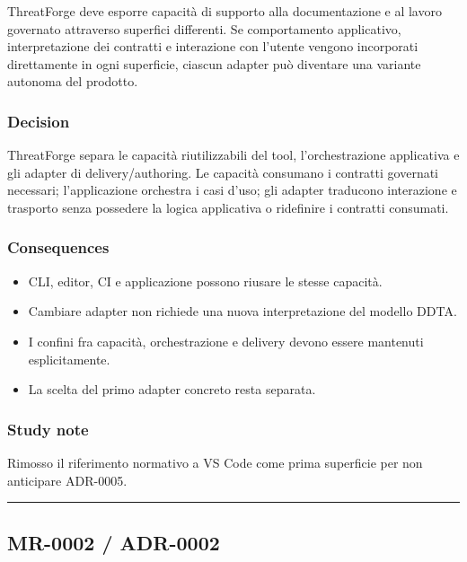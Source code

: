 \documentclass[
  10pt,
  a4paper,
]{article}
\providecommand{\tightlist}{%
  \setlength{\itemsep}{0pt}\setlength{\parskip}{0pt}}
\begin{document}
ThreatForge deve esporre capacità di supporto alla documentazione e al
lavoro governato attraverso superfici differenti. Se comportamento
applicativo, interpretazione dei contratti e interazione con l'utente
vengono incorporati direttamente in ogni superficie, ciascun adapter può
diventare una variante autonoma del prodotto.

\subsubsection{Decision}\label{decision-8}

ThreatForge separa le capacità riutilizzabili del tool, l'orchestrazione
applicativa e gli adapter di delivery/authoring. Le capacità consumano i
contratti governati necessari; l'applicazione orchestra i casi d'uso;
gli adapter traducono interazione e trasporto senza possedere la logica
applicativa o ridefinire i contratti consumati.

\subsubsection{Consequences}\label{consequences-8}

\begin{itemize}
\tightlist
\item
  CLI, editor, CI e applicazione possono riusare le stesse capacità.
\item
  Cambiare adapter non richiede una nuova interpretazione del modello
  DDTA.
\item
  I confini fra capacità, orchestrazione e delivery devono essere
  mantenuti esplicitamente.
\item
  La scelta del primo adapter concreto resta separata.
\end{itemize}

\subsubsection{Study note}\label{study-note-5}

Rimosso il riferimento normativo a VS Code come prima superficie per non
anticipare ADR-0005.

\begin{center}\rule{0.5\linewidth}{0.5pt}\end{center}

\subsection{MR-0002 / ADR-0002}\label{mr-0002-adr-0002}
\end{document}
